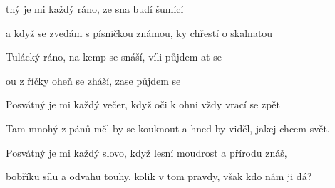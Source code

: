 

\zs
{}tný je mi každý ráno,
 ze sna budí šumící 

a když se zvedám s písničkou známou,
ky chřestí o skalnatou 
\ks

\zr
Tulácký ráno, na kemp se snáší,
víli půjdem at se 

ou z říčky oheň se zháší,
 zase půjdem  se 
\kr

\zs
Posvátný je mi každý večer,
když oči k ohni vždy vrací se zpět

Tam mnohý z pánů měl by se kouknout
a hned by viděl, jakej chcem svět.
\ks

\zr \kr

\zs
Posvátný je mi každý slovo,
když lesní moudrost a přírodu znáš,

bobříku sílu a odvahu touhy,
kolik v tom pravdy, však kdo nám ji dá?
\ks

\zr \kr

\kp






